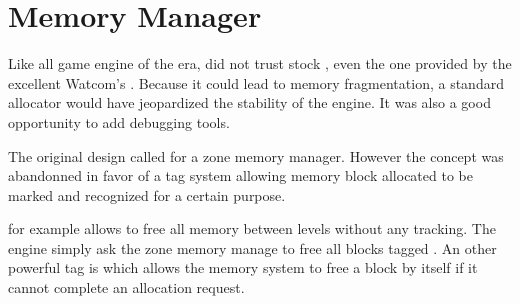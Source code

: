 \section{Memory Manager}
Like all game engine of the era, \doom did not trust stock , even the one provided by the excellent Watcom's . Because it could lead to memory fragmentation, a standard allocator would have jeopardized the stability of the engine. It was also a good opportunity to add debugging tools.\\
\par
The original design called for a zone memory manager. However the concept was abandonned in favor of a tag system allowing memory block allocated to be marked and recognized for a certain purpose.\\
\par
{}
\par
{} for example allows \doom to free all memory between levels without any tracking. The engine simply ask the zone memory manage to free all blocks tagged . An other powerful tag is  which allows the memory system to free a block by itself if it cannot complete an allocation request. \\
\par
  
\par
{}
\par
{}
